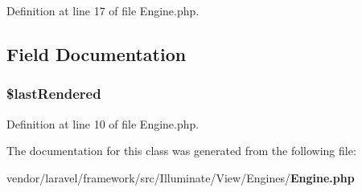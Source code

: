 Definition at line 17 of file Engine.\+php.



\subsection{Field Documentation}
\subsubsection[{\$last\+Rendered}]{\setlength{\rightskip}{0pt plus 5cm}\$last\+Rendered\hspace{0.3cm}{\ttfamily [protected]}}\label{class_illuminate_1_1_view_1_1_engines_1_1_engine_a88feece741ec950fbc66e11e5254d248}


Definition at line 10 of file Engine.\+php.



The documentation for this class was generated from the following file\+:\begin{DoxyCompactItemize}
\item 
vendor/laravel/framework/src/\+Illuminate/\+View/\+Engines/{\bf Engine.\+php}\end{DoxyCompactItemize}
